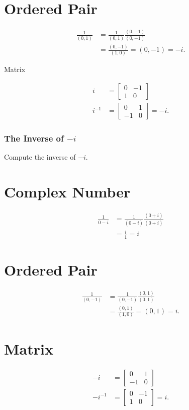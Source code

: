 \documentclass[10pt]{article}
\begin{document}
\section{Ordered Pair}
$$
\begin{aligned}
\frac{1}{(0,1)} & =\frac{1}{(0,1)} \frac{(0,-1)}{(0,-1)} \\
& =\frac{(0,-1)}{(1,0)}=(0,-1)=-i .
\end{aligned}
$$

Matrix

$$
\begin{aligned}
i & =\left[\begin{array}{cc}
0 & -1 \\
1 & 0
\end{array}\right] \\
i^{-1} & =\left[\begin{array}{cc}
0 & 1 \\
-1 & 0
\end{array}\right]=-i .
\end{aligned}
$$

\subsubsection{The Inverse of $-i$}
Compute the inverse of $-i$.

\section{Complex Number}
$$
\begin{aligned}
\frac{1}{0-i} & =\frac{1}{(0-i)} \frac{(0+i)}{(0+i)} \\
& =\frac{i}{1}=i
\end{aligned}
$$

\section{Ordered Pair}
$$
\begin{aligned}
\frac{1}{(0,-1)} & =\frac{1}{(0,-1)} \frac{(0,1)}{(0,1)} \\
& =\frac{(0,1)}{(1,0)}=(0,1)=i .
\end{aligned}
$$

\section{Matrix}
$$
\begin{aligned}
-i & =\left[\begin{array}{cc}
0 & 1 \\
-1 & 0
\end{array}\right] \\
-i^{-1} & =\left[\begin{array}{cc}
0 & -1 \\
1 & 0
\end{array}\right]=i .
\end{aligned}
$$
\end{document}
